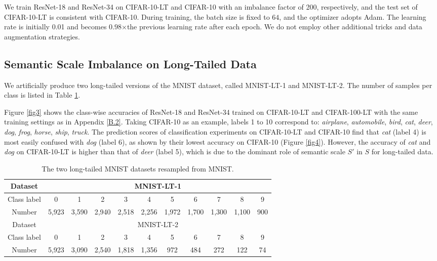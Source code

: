\documentclass[10pt]{article} %
\begin{document}
We train ResNet-18 and ResNet-34 on CIFAR-10-LT and CIFAR-10 with an imbalance factor of 200, respectively, and the test set of CIFAR-10-LT is consistent with CIFAR-10. During training, the batch size is fixed to $64$, and the optimizer adopts Adam. The learning rate is initially 0.01 and becomes $0.98$$\times$the previous learning rate after each epoch. We do not employ other additional tricks and data augmentation strategies.



\subsection{Semantic Scale Imbalance on Long-Tailed Data\label{B.3}}

We artificially produce two long-tailed versions of the MNIST dataset, called MNIST-LT-1 and MNIST-LT-2. The number of samples per class is listed in Table \ref{table7}. 

Figure \ref{fig3} shows the class-wise accuracies of ResNet-18 and ResNet-34 trained on CIFAR-10-LT and CIFAR-100-LT with the same training settings as in Appendix \ref{B.2}. Taking CIFAR-10 as an example, labels 1 to 10 correspond to:  \emph{airplane},  \emph{automobile},  \emph{bird},  \emph{cat},  \emph{deer},  \emph{dog},  \emph{frog},  \emph{horse},  \emph{ship},  \emph{truck}. The prediction scores of classification experiments on CIFAR-10-LT and CIFAR-10 find that \emph{cat} (label 4) is most easily confused with \emph{dog} (label 6), as shown by their lowest accuracy on CIFAR-10 (Figure \ref{fig4}). However, the accuracy of \emph{cat} and \emph{dog} on CIFAR-10-LT is higher than that of \emph{deer} (label 5), which is due to the dominant role of semantic scale $S'$ in $S$ for long-tailed data.


\begin{table}[h]
\vskip -0.1in
\renewcommand\arraystretch{1.5}
\setlength{\tabcolsep}{9pt} %
\caption{The two long-tailed MNIST datasets resampled from MNIST.}
\label{table7}
\vskip -0.1in
\begin{center}
\begin{tabular}{c|cccccccccc}
\hline \toprule
Dataset       &  \multicolumn{10}{c}{MNIST-LT-1} \\
\hline
Class label & 0 & 1 & 2 & 3 &  4 & 5 & 6 & 7 & 8 & 9 \\ 
Number & 5,923 & 3,590 & 2,940 & 2,518 & 2,256 & 1,972 & 1,700 & 1,300 & 1,100 & 900 \\ \hline
Dataset       &  \multicolumn{10}{c}{MNIST-LT-2} \\
\hline
Class label & 0 & 1 & 2 & 3 &  4 & 5 & 6 & 7 & 8 & 9 \\ 
Number & 5,923 & 3,090 & 2,540 & 1,818 & 1,356 & 972 & 484 & 272 & 122 & 74 \\
\bottomrule \hline
\end{tabular}
\end{center}
\vskip -0.1in
\end{table}
\end{document}
